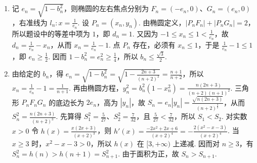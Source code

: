 \begin{solution}
\begin{enumerate}
\item 记 \(e_n=\sqrt{1-b_n^{2}}\)，则椭圆的左右焦点分别为 \(F_n=(-e_n,0)\)、\(G_n=(e_n,0)\)，右准线为 \(l_n\colon x=\frac1{e_n}\). 设 \(P_n=(x_n,y_n)\). 由椭圆定义，\(|P_nF_n|+|P_nG_n|=2\)，所以题设中的等差中项为 \(1\)，即 \(d_n=1\). 又因为 \(-1\leqslant x_n\leqslant1<\frac1{e_n}\)，故 \(d_n=\frac1{e_n}-x_n\)，从而 \(x_n=\frac1{e_n}-1\). 点 \(P_n\) 存在，必须有 \(x_n\leqslant1\)，于是 \(\frac1{e_n}-1\leqslant1\)，即 \(e_n\geqslant\frac12\). 因而 \(1-b_n^{2}=e_n^{2}\geqslant\frac14\)，所以 \(b_n\leqslant\frac{\sqrt3}{2}\).
\item 由给定的 \(b_n\)，得 \(e_n=\sqrt{1-b_n^{2}}=\sqrt{1-\frac{2n+3}{(n+2)^{2}}}=\frac{n+1}{n+2}\)，所以 \(x_n=\frac1{e_n}-1=\frac1{n+1}\). 再由椭圆方程，\(y_n^{2}=b_n^{2}(1-x_n^{2})=\frac{n(2n+3)}{(n+2)(n+1)^{2}}\). 三角形 \(P_nF_nG_n\) 的底边长为 \(2e_n\)，高为 \(|y_n|\)，故 \(S_n=e_n|y_n|=\frac{\sqrt{n(2n+3)}}{(n+2)^{\frac{3}{2}}}\)，从而 \(S_n^{2}=\frac{n(2n+3)}{(n+2)^{3}}\). 先算得 \(S_1^{2}=\frac5{27}\)、\(S_2^{2}=\frac7{32}\)，且 \(\frac5{27}<\frac7{32}\)，所以 \(S_1<S_2\). 对实数 \(x>0\) 令 \(h(x)=\frac{x(2x+3)}{(x+2)^{3}}\)，则 \(h'(x)=\frac{-2x^{2}+2x+6}{(x+2)^{4}}=-\frac{2(x^{2}-x-3)}{(x+2)^{4}}\). 当 \(x\geqslant3\) 时，\(x^{2}-x-3>0\)，所以 \(h(x)\) 在 \([3,+\infty)\) 上递减. 因而对 \(n\geqslant3\)，有 \(S_n^{2}=h(n)>h(n+1)=S_{n+1}^{2}\). 由于面积为正，故 \(S_n>S_{n+1}\).
\end{enumerate}
\end{solution}
